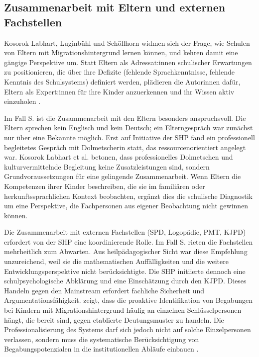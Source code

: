 \documentclass[ngerman, a4paper]{article}
\begin{document}
\subsection{Zusammenarbeit mit Eltern und externen Fachstellen}

Kosorok Labhart, Luginbühl und Schöllhorn widmen sich der Frage, wie Schulen
von Eltern mit Migrationshintergrund lernen können, und kehren damit eine gängige
Perspektive um. Statt Eltern als Adressat:innen schulischer Erwartungen zu
positionieren, die über ihre Defizite (fehlende Sprachkenntnisse, fehlende
Kenntnis des Schulsystems) definiert werden, plädieren die Autorinnen dafür, Eltern
als Expert:innen für ihre Kinder anzuerkennen und ihr Wissen aktiv einzuholen
\parencite{kosoroklabhart2021voneltern}.

Im Fall S. ist die Zusammenarbeit mit den Eltern besonders anspruchsvoll. Die Eltern
sprechen kein Englisch und kein Deutsch; ein Elterngespräch war zunächst nur über
eine Bekannte möglich. Erst auf Initiative der SHP fand ein professionell
begleitetes Gespräch mit Dolmetscherin statt, das ressourcenorientiert angelegt war.
Kosorok Labhart et al. betonen, dass professionelles Dolmetschen und
kulturvermittelnde Begleitung keine Zusatzleistungen sind, sondern Grundvoraussetzungen
für eine gelingende Zusammenarbeit. Wenn Eltern die Kompetenzen ihrer Kinder
beschreiben, die sie im familiären oder herkunftssprachlichen Kontext beobachten,
ergänzt dies die schulische Diagnostik um eine Perspektive, die Fachpersonen aus
eigener Beobachtung nicht gewinnen können.

Die Zusammenarbeit mit externen Fachstellen (SPD, Logopädie, PMT, KJPD)
erfordert von der SHP eine koordinierende Rolle. Im Fall S. rieten die
Fachstellen mehrheitlich zum Abwarten. Aus heilpädagogischer Sicht war diese
Empfehlung unzureichend, weil sie die mathematischen Auffälligkeiten und die
weitere Entwicklungsperspektive nicht berücksichtigte. Die SHP initiierte
dennoch eine schulpsychologische Abklärung und eine Einschätzung durch den KJPD.
Dieses Handeln gegen den Mainstream erfordert fachliche Sicherheit und
Argumentationsfähigkeit. \textcite{leikhof2021jugendliche} zeigt, dass die proaktive Identifikation von
Begabungen bei Kindern mit Migrationshintergrund häufig an einzelnen
Schlüsselpersonen hängt, die bereit sind, gegen etablierte Deutungsmuster zu
handeln. Die Professionalisierung des Systems darf sich jedoch nicht auf solche
Einzelpersonen verlassen, sondern muss die systematische Berücksichtigung
von Begabungspotenzialen in die institutionellen Abläufe einbauen
\parencite{leikhof2021jugendliche}.
\end{document}
